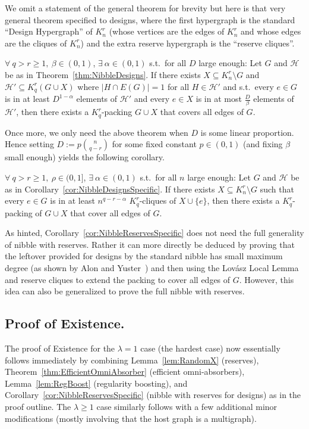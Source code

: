 \documentclass[twoside,leqno]{article}
\begin{document}
We omit a statement of the general theorem for brevity but here is that very general theorem specified to designs, where the first hypergraph is the standard ``Design Hypergraph'' of $K_n^r$ (whose vertices are the edges of $K_n^r$ and whose edges are the cliques of $K_n^r$) and the extra reserve hypergraph is the ``reserve cliques''.

\begin{theorem}\label{thm:NibbleReservesDesigns}
$\forall~q > r\ge 1,~\beta \in (0,1)$, $\exists~\alpha\in (0,1)$ s.t.~for all $D$ large enough:
Let $G$ and $\mathcal{H}$ be as in Theorem~\ref{thm:NibbleDesigns}. If there exists $X\subseteq K_n^r\setminus G$ and $\mathcal{H}' \subseteq K_q^r(G\cup X)$ where $|H\cap E(G)|=1$ for all $H\in \mathcal{H}'$ and s.t.~every $e\in G$ is in at least $D^{1-\alpha}$ elements of $\mathcal{H}'$ and every $e\in X$ is in at most $\frac{D}{\beta}$ elements of $\mathcal{H'}$, then there exists a $K_q^r$-packing $G\cup X$ that covers all edges of $G$. 
\end{theorem}

Once more, we only need the above theorem when $D$ is some linear proportion. Hence setting $D:=p \binom{n}{q-r}$ for some fixed constant $p\in (0,1)$ (and fixing $\beta$ small enough) yields the following corollary.

\begin{corollary}\label{cor:NibbleReservesSpecific}
$\forall~q > r\ge 1,~\rho \in (0,1]$, $\exists~\alpha\in (0,1)$ s.t.~for all $n$ large enough: Let $G$ and $\mathcal{H}$ be as in Corollary~\ref{cor:NibbleDesignsSpecific}. If there exists $X\subseteq K_n^r\setminus G$ such that every $e\in G$ is in at least $n^{q-r-\alpha}$ $K_q^r$-cliques of $X\cup \{e\}$, then there exists a $K_q^r$-packing of $G\cup X$ that cover all edges of $G$. 
\end{corollary}

As hinted, Corollary~\ref{cor:NibbleReservesSpecific} does not need the full generality of nibble with reserves. Rather it can more directly be deduced by proving that the leftover provided for designs by the standard nibble has small maximum degree (as shown by Alon and Yuster~\cite{AY05}) and then using the Lov\'asz Local Lemma and reserve cliques to extend the packing to cover all edges of $G$. However, this idea can also be generalized to prove the full nibble with reserves. 

\subsection{Proof of Existence.} The proof of Existence for the $\lambda=1$ case (the hardest case) now essentially follows immediately by combining Lemma~\ref{lem:RandomX} (reserves), Theorem~\ref{thm:EfficientOmniAbsorber} (efficient omni-absorbers), Lemma~\ref{lem:RegBoost} (regularity boosting), and Corollary~\ref{cor:NibbleReservesSpecific} (nibble with reserves for designs) as in the proof outline. The $\lambda\ge 1$ case similarly follows with a few additional minor modifications (mostly involving that the host graph is a multigraph).
\end{document}

